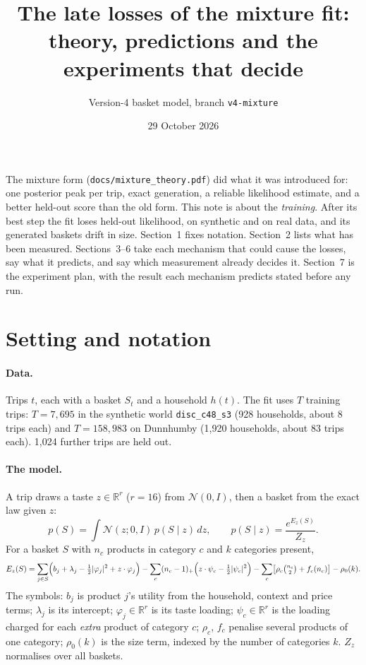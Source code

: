 \documentclass[11pt]{article}
\title{The late losses of the mixture fit: theory, predictions and the experiments that decide}
\author{Version-4 basket model, branch \texttt{v4-mixture}}
\date{29 October 2026}
\theoremstyle{remark}\newtheorem{remark}{Remark}
\newcommand{\R}{\mathbb{R}}
\newcommand{\N}{\mathcal{N}}
\begin{document}
\maketitle

\noindent The mixture form (\texttt{docs/mixture\_theory.pdf}) did what it was introduced for: one
posterior peak per trip, exact generation, a reliable likelihood estimate, and a better held-out
score than the old form. This note is about the \emph{training}. After its best step the fit loses
held-out likelihood, on synthetic and on real data, and its generated baskets drift in size.
Section~1 fixes notation. Section~2 lists what has been measured. Sections~3--6 take each
mechanism that could cause the losses, say what it predicts, and say which measurement already
decides it. Section~7 is the experiment plan, with the result each mechanism predicts stated
before any run.

\section{Setting and notation}

\paragraph{Data.} Trips $t$, each with a basket $S_t$ and a household $h(t)$. The fit uses $T$
training trips: $T=7{,}695$ in the synthetic world \texttt{disc\_c48\_s3} (928 households, about
8 trips each) and $T=158{,}983$ on Dunnhumby (1,920 households, about 83 trips each). 1,024
further trips are held out.

\paragraph{The model.} A trip draws a taste $z\in\R^r$ ($r=16$) from $\N(0,I)$, then a basket from
the exact law given $z$:
\begin{equation}\label{eq:marg}
p(S)=\int \N(z;0,I)\,p(S\mid z)\,dz,\qquad p(S\mid z)=\frac{e^{E_z(S)}}{Z_z}.
\end{equation}
For a basket $S$ with $n_c$ products in category $c$ and $k$ categories present,
\begin{equation}\label{eq:Ez}
E_z(S)=\sum_{j\in S}\Bigl(b_j+\lambda_j-\tfrac12|\varphi_j|^2+z\cdot\varphi_j\Bigr)
-\sum_c (n_c-1)_+\Bigl(z\cdot\psi_c-\tfrac12|\psi_c|^2\Bigr)
-\sum_c\bigl[\rho_c\tbinom{n_c}{2}+f_c(n_c)\bigr]-\rho_0(k).
\end{equation}
The symbols: $b_j$ is product $j$'s utility from the household, context and price terms;
$\lambda_j$ is its intercept; $\varphi_j\in\R^r$ is its taste loading; $\psi_c\in\R^r$ is the
loading charged for each \emph{extra} product of category $c$; $\rho_c$, $f_c$ penalise several
products of one category; $\rho_0(k)$ is the size term, indexed by the number of categories $k$.
$Z_z$ normalises over all baskets.
\end{document}
